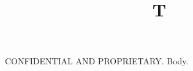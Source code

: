 \documentclass{article}
\title{T}
\newif\ifcopyright
\renewcommand\maketitle{%
  \ifcopyright\backgroundsetup{contents=X}\fi
  CONFIDENTIAL AND PROPRIETARY.}
\begin{document}
\maketitle
Body.
\end{document}
